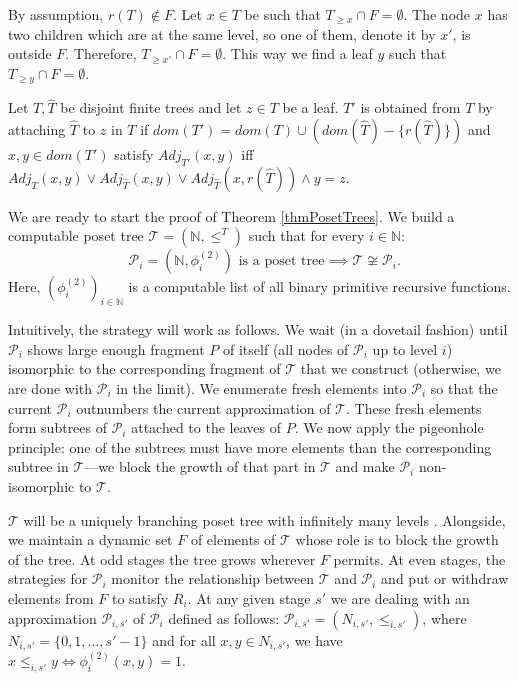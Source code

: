 \documentclass[a4paper,UKenglish,cleveref, autoref, thm-restate]{lipics-v2021}
\begin{document}
\begin{claimproof}
    By assumption, $r(T) \notin F$. Let $x \in T$ be such that $T_{\geq x} \cap F = \emptyset$. The node $x$ has two children which are at the same level, so one of them, denote it by $x'$, is outside $F$. Therefore, $T_{\geq x'} \cap F = \emptyset$. This way we find a leaf $y$ such that $T_{\geq y} \cap F = \emptyset$.
\end{claimproof}
    Let $T, \hat T$ be disjoint finite trees and let $z \in T$ be a leaf. $T'$ is obtained from $T$ by attaching $\hat T$ to $z$ in $T$ if $dom(T') = dom(T) \cup (dom(\hat T) - \{r(\hat T)\})$ and $x,y \in dom (T')$ satisfy $Adj_{T'}(x,y)$ iff $Adj_T(x,y) \vee Adj_{\hat T}(x,y) \vee Adj_{\hat T}(x, r(\hat T)) \wedge y = z$.





We are ready to start the proof of Theorem \ref{thmPosetTrees}. We build a computable poset tree $\mathcal T = (\mathbb N, \leq^T)$ such that for every $ i \in \mathbb N$: \begin{equation}\text{ $\mathcal P_i = (\mathbb N, \phi_i^{(2)})$ is a poset tree} \implies \mathcal T  \not\cong \mathcal P_i.\tag{$R_i$}\end{equation}
Here, $(\phi_i^{(2)})_{i\in\mathbb{N}}$ is a computable list of all binary primitive recursive functions. 

Intuitively, the strategy will work as follows. We wait (in a dovetail fashion) until $\mathcal P_i$ shows large enough fragment $P$ of itself (all nodes of $\mathcal P_i$ up to level $i$) isomorphic to the corresponding fragment of $\mathcal T$ that we construct (otherwise, we are done with $\mathcal P_i$ in the limit). We enumerate fresh elements into $\mathcal P_i$ so that the current $\mathcal P_i$ outnumbers the current approximation of $\mathcal T$. These fresh elements form subtrees of $\mathcal P_i$ attached to the leaves of $P$. We now apply the pigeonhole principle: one of the subtrees must have more elements than the corresponding subtree in $\mathcal T$---we block the growth of that part in $\mathcal T$ and make $\mathcal P_i$ non-isomorphic to $\mathcal T$. 


$\mathcal T$ will be a uniquely branching poset tree with infinitely many levels . Alongside, we maintain a dynamic set $F$ of elements of $\mathcal T$ whose role is to block the growth of the tree. At odd stages the tree grows wherever $F$ permits. At even stages, the strategies for $\mathcal P_i$ monitor the relationship between $\mathcal T$ and $\mathcal P_i$ and put or withdraw elements from $F$ to satisfy $R_i$. At any given stage $s'$ we are dealing with an approximation $\mathcal P_{i,s'}$ of $\mathcal P_{i}$ defined as follows: $\mathcal P_{i,s'} = (N_{i,s'}, \leq_{i,s'})$, where $N_{i,s'} = \{0,1,\dots, s'-1\}$ and for all $x,y \in N_{i,s'}$, we have $x \leq_{i,s'} y \Leftrightarrow \phi^{(2)}_i(x,y) = 1$.
\end{document}
